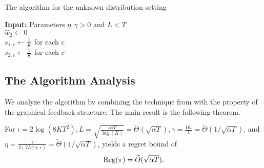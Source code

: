 \begin{algorithm}
\caption{The algorithm for the unknown distribution setting}
\label{alg:unknown}
\textbf{Input:} Parameters $\eta, \gamma > 0$ and $L < T$. \\
$\widehat{w}_2\leftarrow 0$\\
$s_{1, c} \leftarrow \frac{1}{K}$ for each $c$\\
$s_{2, c} \leftarrow \frac{1}{K}$ for each $c$\\
\end{algorithm}

\subsection{The Algorithm Analysis}
We analyze the algorithm by combining the technique from \citet{Sch23} with the property of the graphical feedback structure. The main result is the following theorem.
\begin{theorem}
\label{thm:main}
For $\iota=2 \log (8 K T^2), L=\sqrt{\frac{\iota \alpha T}{\log (K)}}=\widetilde{\Theta}(\sqrt{\alpha T}), \gamma=\frac{16 \iota}{L}=\widetilde{\Theta}(1 / \sqrt{\alpha T})$, and $\eta=\frac{\gamma}{2(2 L \gamma+\iota)}=\widetilde{\Theta}(1 / \sqrt{\alpha T})$,  yields a regret bound of
\[\operatorname{\mathrm{Reg}}(\pi)= \widetilde{O}(\sqrt{\alpha T}).\]
\end{theorem}

